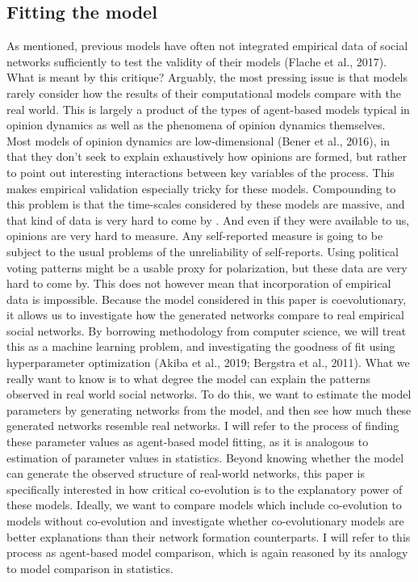 \documentclass{article}
\begin{document}
\subsection{Fitting the model}
As mentioned, previous models have often not integrated empirical data of social networks sufficiently to test the validity of their models (Flache et al., 2017). What is meant by this critique? Arguably, the most pressing issue is that models rarely consider how the results of their computational models compare with the real world. This is largely a product of the types of agent-based models typical in opinion dynamics as well as the phenomena of opinion dynamics themselves. Most models of opinion dynamics are low-dimensional (Bener et al., 2016), in that they don’t seek to explain exhaustively how opinions are formed, but rather to point out interesting interactions between key variables of the process. This makes empirical validation especially tricky for these models. Compounding to this problem is that the time-scales considered by these models are massive, and that kind of data is very hard to come by \cite{mas2019challenges}. And even if they were available to us, opinions are very hard to measure. Any self-reported measure is going to be subject to the usual problems of the unreliability of self-reports. Using political voting patterns might be a usable proxy for polarization, but these data are very hard to come by. 
This does not however mean that incorporation of empirical data is impossible. Because the model considered in this paper is coevolutionary, it allows us to investigate how the generated networks compare to real empirical social networks. By borrowing methodology from computer science, we will treat this as a machine learning problem, and investigating the goodness of fit using hyperparameter optimization (Akiba et al., 2019; Bergstra et al., 2011). What we really want to know is to what degree the model can explain the patterns observed in real world social networks. To do this, we want to estimate the model parameters by generating networks from the model, and then see how much these generated networks resemble real networks. I will refer to the process of finding these parameter values as agent-based model fitting, as it is analogous to estimation of parameter values in statistics. Beyond knowing whether the model can generate the observed structure of real-world networks, this paper is specifically interested in how critical co-evolution is to the explanatory power of these models. Ideally, we want to compare models which include co-evolution to models without co-evolution and investigate whether co-evolutionary models are better explanations than their network formation counterparts. I will refer to this process as agent-based model comparison, which is again reasoned by its analogy to model comparison in statistics. 
\end{document}
